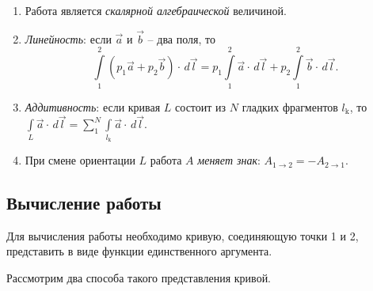 	\begin{enumerate}
	\item Работа является \textit{скалярной алгебраической} величиной.
	\item \textit{Линейность}: если \( \vec{a} \) и \( \vec{b} \) -- два поля, то
	\[ \int\limits_1^2 (p_1\vec{a} + p_2\vec{b})\cdot\,d\vec{l} = p_1\int\limits_1^2 \vec{a}\cdot\,d\vec{l} + p_2\int\limits_1^2 \vec{b}\cdot\,d\vec{l}. \]
	\item \textit{Аддитивность}: если кривая \( L \) состоит из \( N \) гладких фрагментов \( l_\mathrm{k} \), то \( \int\limits_L \vec{a}\cdot\,d\vec{l} = \sum\limits_1^N \int\limits_{l_\mathrm{k}} \vec{a}\cdot\,d\vec{l} \).
	\item При смене ориентации \( L \) работа \( A \) \textit{меняет знак}: \( A_{1\to2} = -A_{2\to1} \).
	\end{enumerate}

\subsection{Вычисление работы}

	Для вычисления работы необходимо кривую, соединяющую точки 1 и 2, представить в виде функции единственного аргумента.
	
	Рассмотрим два способа такого представления кривой.
	
